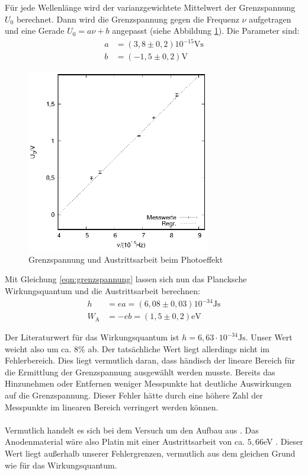 \vfill
\clearpage

Für jede Wellenlänge wird der varianzgewichtete Mittelwert der Grenzspannung $U_0$ berechnet. Dann wird die Grenzspannung gegen die Frequenz $\nu$ aufgetragen und eine Gerade $U_0=a\nu+b$ angepasst (siehe Abbildung \ref{planck}). Die Parameter sind: 
\begin{align*}
  a&=(3,8 \pm 0,2)10^{-15}\mathrm{Vs}\\  
  b&=(-1,5 \pm 0,2) \mathrm{V}
\end{align*}

\begin{figure}[h]
  \centering
  \includegraphics[width=8cm]{data/Messung_photoeffekt/f_u.eps}
  \caption{Grenzspannung und Austrittsarbeit beim Photoeffekt}
  \label{planck}
\end{figure}


Mit Gleichung \ref{eqn:grenzspannung} lassen sich nun das Plancksche Wirkungsquantum und die Austrittsarbeit berechnen:
\begin{align*}
  h&=ea=(6,08 \pm 0,03)10^{-34}\mathrm{Js}\\
  W_\mathrm{A}&=-eb=(1,5 \pm 0,2)\mathrm{eV}
\end{align*}

Der Literaturwert für das Wirkungsquantum ist $h=6,63 \cdot 10^{-34}\mathrm{Js}$. Unser Wert weicht also um ca. $8\%$ ab. Der tatsächliche Wert liegt allerdings nicht im Fehlerbereich. Dies liegt vermutlich daran, dass händisch der lineare Bereich für die Ermittlung der Grenzspannung ausgewählt werden musste. Bereits das Hinzunehmen oder Entfernen weniger Messpunkte hat deutliche Auswirkungen auf die Grenzspannung. Dieser Fehler hätte durch eine höhere Zahl der Messpunkte im linearen Bereich verringert werden können. \\ \\
Vermutlich handelt es sich bei dem Versuch um den Aufbau aus \cite{leybold}. Das Anodenmaterial wäre also Platin mit einer Austrittsarbeit von ca. $5,66$eV \cite{kalium}. Dieser Wert liegt außerhalb unserer Fehlergrenzen, vermutlich aus dem gleichen Grund wie für das Wirkungsquantum. \\ \\

